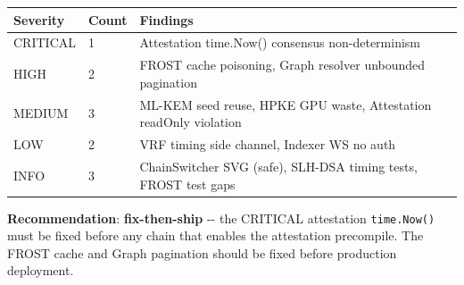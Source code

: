 \documentclass[
]{article}
\newcounter{none} %
\begin{document}
{\def\LTcaptype{none} %
\begin{longtable}[]{@{}lll@{}}
\toprule\noalign{}
Severity & Count & Findings \\
\midrule\noalign{}
\endhead
\bottomrule\noalign{}
\endlastfoot
CRITICAL & 1 & Attestation time.Now() consensus non-determinism \\
HIGH & 2 & FROST cache poisoning, Graph resolver unbounded pagination \\
MEDIUM & 3 & ML-KEM seed reuse, HPKE GPU waste, Attestation readOnly
violation \\
LOW & 2 & VRF timing side channel, Indexer WS no auth \\
INFO & 3 & ChainSwitcher SVG (safe), SLH-DSA timing tests, FROST test
gaps \\
\end{longtable}
}

\textbf{Recommendation}: \textbf{fix-then-ship} -\/- the CRITICAL
attestation \texttt{time.Now()} must be fixed before any chain that
enables the attestation precompile. The FROST cache and Graph pagination
should be fixed before production deployment.
\end{document}

